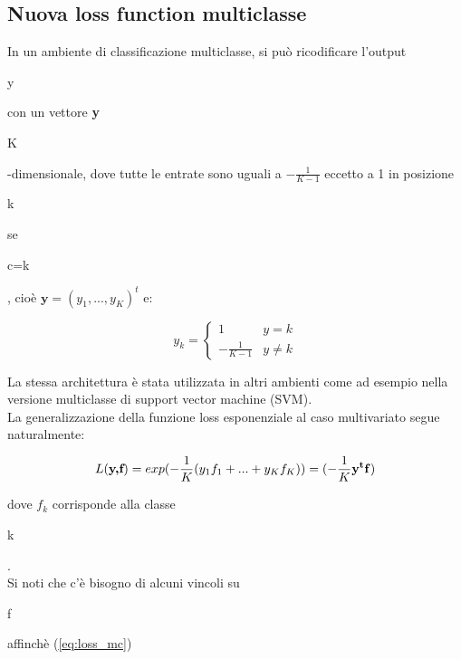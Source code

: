 \subsection{Nuova loss function multiclasse}
In un ambiente di classificazione multiclasse, si pu\`o ricodificare l'output \begin{it}y\end{it} 
con un vettore \textbf{y} \begin{it}K\end{it}-dimensionale, 
dove tutte le entrate sono uguali a \begin{math}-\frac{1}{K-1} \end{math}
 eccetto a 1 in posizione \begin{it}k \end{it} se \begin{it}c=k\end{it}, 
cio\`e \begin{math} \textbf{y} =(y_1,...,y_K)^t\end{math} e:
\begin{center}
 \begin{equation}\label{eq:vet_mc}
 y_k=\begin{cases}1 & y=k\\
-\frac{1}{K-1} & y\ne k\end{cases}
\end{equation}
\end{center}
La stessa architettura \`e stata utilizzata in altri ambienti come ad esempio nella versione multiclasse di 
support vector machine (SVM).\\
\newline
La generalizzazione della funzione loss esponenziale al caso multivariato segue naturalmente:
 \begin{center}
 \begin{equation} \label{eq:loss_mc}
L(\textbf{y,f}) =
exp(-\frac{1}{K}(y_1f_1 + ... + y_Kf_K)) = (-\frac{1}{K}\begin{bf}y^tf\end{bf})
\end{equation}
\end{center}
dove \begin{math}f_k\end{math} corrisponde alla classe \begin{it}k\end{it}.\\
\newline
Si noti che c'\`e bisogno di alcuni vincoli su \begin{bf}f\end{bf} affinch\`e (\ref{eq:loss_mc}) 
